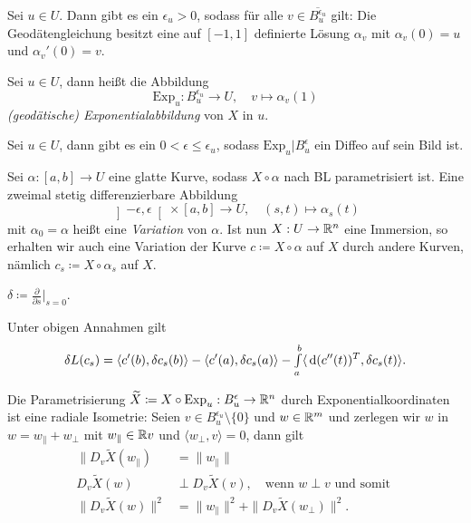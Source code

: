 \documentclass{cheat-sheet}
\newcommand{\Exp}{\mathrm{Exp}} %
\newcommand{\ointervall}[1]{\left]#1\right[} %
\begin{document}
\begin{satz}
  Sei $u \in U$. Dann gibt es ein $\epsilon_u > 0$, sodass für alle $v \in \overline{B_u^{\epsilon_u}}$ gilt: Die Geodätengleichung besitzt eine auf $[-1,1]$ definierte Lösung $\alpha_v$ mit $\alpha_v(0) = u$ und $\alpha_v'(0) = v$.
\end{satz}

\begin{defn}
  Sei $u \in U$, dann heißt die Abbildung
  \[ \Exp_u : B_u^{\epsilon_u} \to U, \quad v \mapsto \alpha_v(1) \]
  \emph{(geodätische) Exponentialabbildung} von $X$ in $u$.
\end{defn}

\begin{defn}
  Sei $u \in U$, dann gibt es ein $0 < \epsilon \leq \epsilon_u$, sodass $\Exp_u|B_u^\epsilon$ ein Diffeo auf sein Bild ist.
\end{defn}

\begin{defn}
  Sei $\alpha : [a, b] \to U$ eine glatte Kurve, sodass $X \circ \alpha$ nach BL parametrisiert ist. Eine zweimal stetig differenzierbare Abbildung
  \[ \ointervall{-\epsilon, \epsilon} \times [a, b] \to U, \quad (s, t) \mapsto \alpha_s(t) \]
  mit $\alpha_0 = \alpha$ heißt eine \emph{Variation} von $\alpha$. Ist nun $X : U \to \mathbb{R}^n$ eine Immersion, so erhalten wir auch eine Variation der Kurve $c \coloneqq X \circ \alpha$ auf $X$ durch andere Kurven, nämlich $c_s \coloneqq X \circ \alpha_s$ auf $X$.
\end{defn}

\begin{nota}
  $\delta \coloneqq \tfrac{\partial}{\partial s}|_{s=0}$.
\end{nota}

\begin{satz}
  Unter obigen Annahmen gilt
  \[ \delta L(c_s) = \langle c'(b), \delta c_s(b) \rangle - \langle c'(a), \delta c_s(a) \rangle - {\textstyle \int\limits_{a}^{b}} \langle \,\mathrm{d} (c''(t))^T, \delta c_s(t) \rangle. \]
\end{satz}

\begin{satz}[Gaußlemma]
  Die Parametrisierung $\widetilde{X} \coloneqq X \circ \Exp_u : B_u^\epsilon \to \R^n$ durch Exponentialkoordinaten ist eine radiale Isometrie: Seien $v \in B_u^{\epsilon_u} \setminus \{0\}$ und $w \in \mathbb{R}^m$ und zerlegen wir $w$ in $w = w_{\|} + w_\perp$ mit $w_{\|} \in \mathbb{R} v$ und $\langle w_\perp, v \rangle = 0$, dann gilt
  \begin{align*}
    \| D_v \widetilde{X}(w_{\|}) &= \| w_{\|} \|\\
    D_v \widetilde{X}(w) &\perp D_v \widetilde{X}(v), \quad \text{wenn $w \perp v$  und somit }\\
    \| D_v \widetilde{X}(w) \|^2 &= \| w_{\|} \|^2 + \| D_v \widetilde{X}(w_{\perp}) \|^2.
  \end{align*}
\end{satz}
\end{document}
